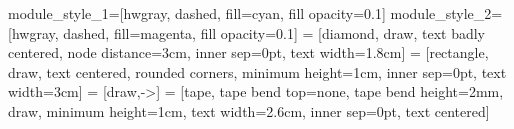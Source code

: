 \usepackage{booktabs}
\usepackage{makecell}

\usepackage{subfiles}


\usepackage[binary-units=true]{siunitx}



\tikzstyle module_style_1=[hwgray, dashed, fill=cyan, fill opacity=0.1]
\tikzstyle module_style_2=[hwgray, dashed, fill=magenta, fill opacity=0.1]
 = [diamond, draw, text badly centered, node distance=3cm, inner sep=0pt, text width=1.8cm]
 = [rectangle, draw, text centered, rounded corners, minimum height=1cm, inner sep=0pt, text width=3cm] 
 = [draw,->]
 = [tape, tape bend top=none, tape bend height=2mm, draw, minimum height=1cm, text width=2.6cm, inner sep=0pt, text centered]
